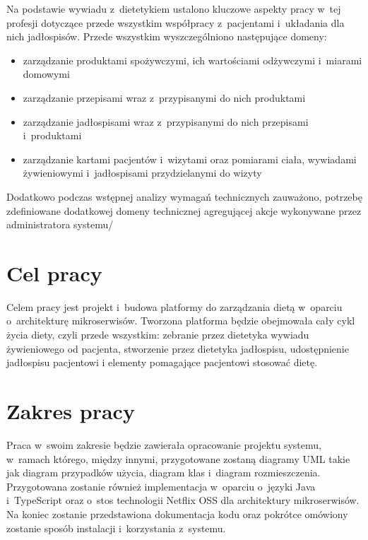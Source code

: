 \par
Na podstawie wywiadu z~dietetykiem ustalono kluczowe aspekty pracy w~tej profesji dotyczące przede wszystkim współpracy z~pacjentami i~układania dla nich jadłospisów.
Przede wszystkim wyszczególniono następujące domeny:
\begin{itemize}
    \item zarządzanie produktami spożywczymi, ich wartościami odżywczymi i~miarami domowymi
    \item zarządzanie przepisami wraz z~przypisanymi do nich produktami
    \item zarządzanie jadłospisami wraz z~przypisanymi do nich przepisami i~produktami
    \item zarządzanie kartami pacjentów i~wizytami oraz pomiarami ciała, wywiadami żywieniowymi i~jadłospisami przydzielanymi do wizyty
\end{itemize}

Dodatkowo podczas wstępnej analizy wymagań technicznych zauważono, potrzebę zdefiniowane dodatkowej domeny technicznej agregującej akcje wykonywane przez administratora systemu/

\section*{Cel pracy}\label{sec:thesis-goal}

Celem pracy jest projekt i~budowa platformy do zarządzania dietą w~oparciu o~architekturę mikroserwisów.
Tworzona platforma będzie obejmowała cały cykl życia diety, czyli przede wszystkim:
zebranie przez dietetyka wywiadu żywieniowego od pacjenta,
stworzenie przez dietetyka jadłospisu,
udostępnienie jadłospisu pacjentowi
i elementy pomagające pacjentowi stosować dietę.

\section*{Zakres pracy}\label{sec:scope-of-work}

Praca w~swoim zakresie będzie zawierała
opracowanie projektu systemu, w~ramach którego, między innymi, przygotowane zostaną diagramy UML takie jak diagram przypadków użycia, diagram klas i~diagram rozmieszczenia.
Przygotowana zostanie również implementacja w~oparciu o~języki Java i~TypeScript oraz o~stos technologii Netflix OSS dla architektury mikroserwisów.
Na koniec zostanie przedstawiona dokumentacja kodu oraz pokrótce omówiony zostanie sposób instalacji i~korzystania z~systemu.

\thispagestyle{normal}
